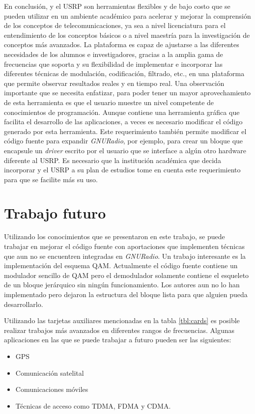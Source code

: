 En conclusi\'on, \gnuradio y el USRP son herramientas flexibles y de bajo costo que se pueden utilizar en un ambiente acad\'emico
para acelerar y mejorar la comprensi\'on de los conceptos de telecomunicaciones, ya sea a nivel licenciatura para el entendimiento
de los conceptos b\'asicos o a nivel maestr\'ia para la investigaci\'on de conceptos m\'as avanzados. La plataforma es capaz de
ajustarse a las diferentes necesidades de los alumnos e investigadores, gracias a la amplia gama de frecuencias que soporta y su
flexibilidad de implementar e incorporar las diferentes t\'ecnicas de modulaci\'on, codificaci\'on, filtrado, etc., en una
plataforma que permite observar resultados reales y en tiempo real. Una observaci\'on importante que se necesita enfatizar, para
poder tener un mayor aprovechamiento de esta herramienta es que el usuario muestre un nivel competente de conocimientos de programaci\'on.
Aunque \gnuradio contiene una herramienta gr\'afica que facilita el desarrollo de las aplicaciones, a veces es necesario modificar el c\'odigo
generado por esta herramienta. Este requerimiento tambi\'en permite modificar el c\'odigo fuente para expandir \emph{GNURadio}, por ejemplo,
para crear un bloque que encapsule un \emph{driver} escrito por el usuario que se interface a alg\'un otro hardware diferente al USRP. Es necesario que la
instituci\'on acad\'emica que decida incorporar \gnuradio y el USRP a su plan de estudios tome en cuenta este requerimiento para que se facilite 
m\'as su uso.

\newpage

\section{Trabajo futuro}
Utilizando los conocimientos que se presentaron en este trabajo, se puede trabajar en mejorar el c\'odigo fuente con aportaciones
que implementen t\'ecnicas que aun no se encuentren integradas en \emph{GNURadio}. Un trabajo interesante es la implementaci\'on
del esquema QAM. Actualmente el c\'odigo fuente contiene un modulador sencillo de QAM pero el demodulador solamente contiene el
esqueleto de un bloque jer\'arquico sin ning\'un funcionamiento. Los autores aun no lo han implementado pero dejaron la estructura
del bloque lista para que alguien pueda desarrollarlo.

Utilizando las tarjetas auxiliares mencionadas en la tabla \ref{tbl:cards} es posible realizar trabajos m\'as avanzados en
diferentes rangos de frecuencias. Algunas aplicaciones en las que se puede trabajar a futuro pueden ser las siguientes:
\begin{itemize}
  \item GPS
  \item Comunicaci\'on satelital
  \item Comunicaciones m\'oviles
  \item T\'ecnicas de acceso como TDMA, FDMA y CDMA.
\end{itemize}